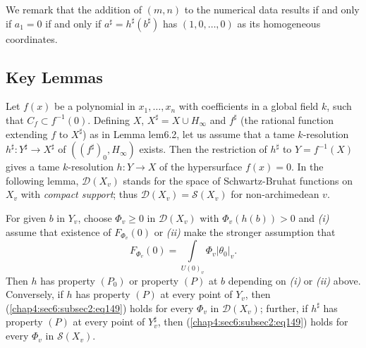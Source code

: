 We remark that the addition of $(m,n)$ to the numerical data results
if and only if $a_{1}=0$ \ie if and only if
$a^{\sharp}=h^{\sharp}(b^{\sharp})$ has $(1,0,\ldots,0)$ as its
homogeneous coordinates.

\subsection{Key Lemmas}\label{chap4:sec6:subsec2} %

Let $f(x)$ be a polynomial in $x_{1},\ldots,x_{n}$ with coefficients
in a global field $k$, such that $C_{f}\subset f^{-1}(0)$. Defining
$X$, $X^{\sharp}=X\cup H_{\infty}$ and $f^{\sharp}$ (the rational
function extending $f$ to $X^{\sharp}$) as in Lemma {lem6.2}, let
us assume that a tame $k$-resolution $h^{\sharp}:Y^{\sharp}\to
X^{\sharp}$ of $((f^{\sharp})_{0},H_{\infty})$ exists. Then the
restriction of $h^{\sharp}$ to $Y=f^{-1}(X)$ gives a tame
$k$-resolution $h:Y\to X$ of the hypersurface $f(x)=0$. In the
following lemma, $\mathscr{D}(X_{v})$ stands for the space of
Schwartz-Bruhat functions on $X_{v}$ with {\em compact support}; thus
$\mathscr{D}(X_{v})=\mathscr{S}(X_{v})$ for non-archimedean $v$.

\begin{lemma}\label{chap4:sec6:subsec2:lem3} %
  For given $b$ in $Y_{v}$, choose $\Phi_{v}\geq 0$ in
  $\mathscr{D}(X_{v})$ with $\Phi_{v}(h(b))>0$ and {\em(i)} assume that
  existence of $F_{\Phi_{v}}(0)$ or {\em(ii)} make the stronger
  assumption that
  \begin{equation*}
    F_{\Phi_{v}}(0)=\int\limits_{U(0)_{v}}\Phi_{v}|\theta_{0}|_{v}.
    \tag{149}\label{chap4:sec6:subsec2:eq149}
  \end{equation*}
  Then $h$ has property $(P_{0})$ or property $(P)$ at $b$ depending on
  {\em(i)} or {\em(ii)} above. Conversely, if $h$ has property $(P)$ at
  every point of $Y_{v}$, then (\ref{chap4:sec6:subsec2:eq149}) holds for every $\Phi_{v}$ in
  $\mathscr{D}(X_{v})$; further, if $h^{\sharp}$ has property $(P)$ at
  every point of $Y^{\sharp}_{v}$, then
  (\ref{chap4:sec6:subsec2:eq149}) holds for every 
  $\Phi_{v}$ in $\mathscr{S}(X_{v})$.
\end{lemma}

